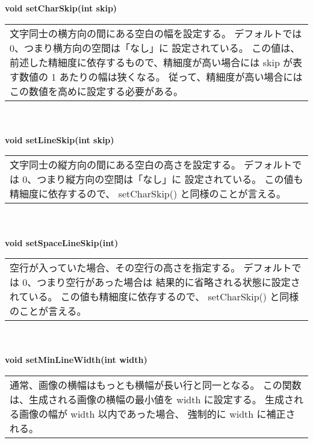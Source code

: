 \begin{tabbing}
\> \textbf{void setCharSkip(int skip)} \\
	\> \> \begin{tabular}{p{15cm}}
		文字同士の横方向の間にある空白の幅を設定する。
		デフォルトでは 0、つまり横方向の空間は「なし」に
		設定されている。
		この値は、前述した精細度に依存するもので、精細度が高い場合には
		skip が表す数値の 1 あたりの幅は狭くなる。
		従って、精細度が高い場合には
		この数値を高めに設定する必要がある。
	\end{tabular} \\ \\

\> \textbf{void setLineSkip(int skip)} \\
	\> \> \begin{tabular}{p{15cm}}
		文字同士の縦方向の間にある空白の高さを設定する。
		デフォルトでは 0、つまり縦方向の空間は「なし」に
		設定されている。
		この値も精細度に依存するので、
		setCharSkip() と同様のことが言える。
	\end{tabular} \\ \\

\> \textbf{void setSpaceLineSkip(int)} \\
	\> \> \begin{tabular}{p{15cm}}
		空行が入っていた場合、その空行の高さを指定する。
		デフォルトでは 0、つまり空行があった場合は
		結果的に省略される状態に設定されている。
		この値も精細度に依存するので、
		setCharSkip() と同様のことが言える。
	\end{tabular} \\ \\

\> \textbf{void setMinLineWidth(int width)} \\
	\> \> \begin{tabular}{p{15cm}}
		通常、画像の横幅はもっとも横幅が長い行と同一となる。
		この関数は、生成される画像の横幅の最小値を width に設定する。
		生成される画像の幅が width 以内であった場合、
		強制的に width に補正される。
	\end{tabular} \\ \\
\end{tabbing}

